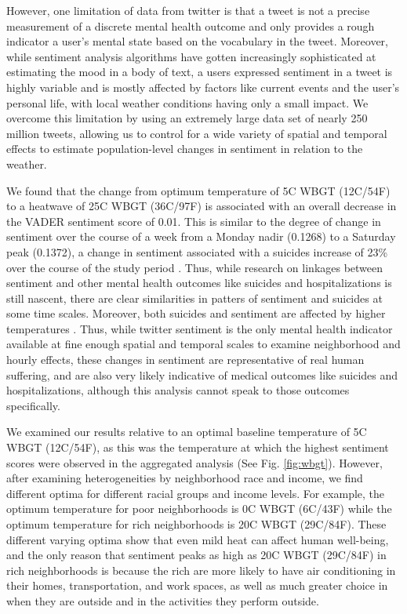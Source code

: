 \documentclass{article}
\begin{document}
However, one limitation of data from twitter is that a tweet is not a precise measurement of a discrete mental health outcome and only provides a rough indicator a user's mental state based on the vocabulary in the tweet.  Moreover, while sentiment analysis algorithms have gotten increasingly sophisticated at estimating the mood in a body of text, a users expressed sentiment in a tweet is highly variable and is mostly affected by factors like current events and the user's personal life, with local weather conditions having only a small impact.  We overcome this limitation by using an extremely large data set of nearly 250 million tweets, allowing us to control for a wide variety of spatial and temporal effects to estimate population-level changes in sentiment in relation to the weather.

We found that the change from optimum temperature of 5\textdegree C WBGT (12\textdegree C/54\textdegree F) to a heatwave of 25\textdegree C WBGT (36\textdegree C/97\textdegree F) is associated with an overall decrease in the VADER sentiment score of 0.01.  This is similar to the degree of change in sentiment over the course of a week from a Monday nadir (0.1268) to a Saturday peak (0.1372), a change in sentiment associated with a suicides increase of 23\% over the course of the study period \cite{CDC2021}.  Thus, while research on linkages between sentiment and other mental health outcomes like suicides and hospitalizations is still nascent, there are clear similarities in patters of sentiment and suicides at some time scales.  Moreover, both suicides and sentiment are affected by higher temperatures \cite{baylis_weather_2018, Burke2018Aug}.  Thus, while twitter sentiment is the only mental health indicator available at fine enough spatial and temporal scales to examine neighborhood and hourly effects, these changes in sentiment are representative of real human suffering, and are also very likely indicative of medical outcomes like suicides and hospitalizations, although this analysis cannot speak to those outcomes specifically.

We examined our results relative to an optimal baseline temperature of 5\textdegree C WBGT (12\textdegree C/54\textdegree F), as this was the temperature at which the highest sentiment scores were observed in the aggregated analysis (See Fig. \ref{fig:wbgt}).  However, after examining heterogeneities by neighborhood race and income, we find different optima for different racial groups and income levels.  For example, the optimum temperature for poor neighborhoods is 0\textdegree C WBGT (6\textdegree C/43\textdegree F) while the optimum temperature for rich neighborhoods is 20\textdegree C WBGT (29\textdegree C/84\textdegree F).  These different varying optima show that even mild heat can affect human well-being, and the only reason that sentiment peaks as high as 20\textdegree C WBGT (29\textdegree C/84\textdegree F) in rich neighborhoods is because the rich are more likely to have air conditioning in their homes, transportation, and work spaces, as well as much greater choice in when they are outside and in the activities they perform outside.
\end{document}
